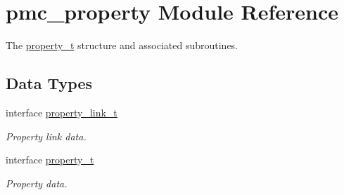 \hypertarget{namespacepmc__property}{}\section{pmc\+\_\+property Module Reference}
\label{namespacepmc__property}


The \mbox{\hyperlink{structpmc__property_1_1property__t}{property\+\_\+t}} structure and associated subroutines.  


\subsection*{Data Types}
\begin{DoxyCompactItemize}
\item 
interface \mbox{\hyperlink{structpmc__property_1_1property__link__t}{property\+\_\+link\+\_\+t}}
\begin{DoxyCompactList}\small\item\em Property link data. \end{DoxyCompactList}\item 
interface \mbox{\hyperlink{structpmc__property_1_1property__t}{property\+\_\+t}}
\begin{DoxyCompactList}\small\item\em Property data. \end{DoxyCompactList}\end{DoxyCompactItemize}
